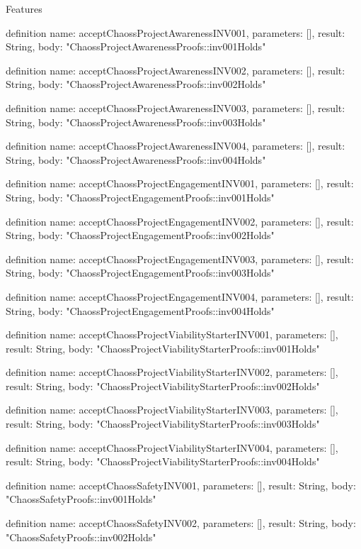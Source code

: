 \begin{lexlean}{Features}
\begin{semanticmodule}
definition{
  name: acceptChaossProjectAwarenessINV001,
  parameters: [],
  result: String,
  body: "ChaossProjectAwarenessProofs::inv001Holds"
}

definition{
  name: acceptChaossProjectAwarenessINV002,
  parameters: [],
  result: String,
  body: "ChaossProjectAwarenessProofs::inv002Holds"
}

definition{
  name: acceptChaossProjectAwarenessINV003,
  parameters: [],
  result: String,
  body: "ChaossProjectAwarenessProofs::inv003Holds"
}

definition{
  name: acceptChaossProjectAwarenessINV004,
  parameters: [],
  result: String,
  body: "ChaossProjectAwarenessProofs::inv004Holds"
}

definition{
  name: acceptChaossProjectEngagementINV001,
  parameters: [],
  result: String,
  body: "ChaossProjectEngagementProofs::inv001Holds"
}

definition{
  name: acceptChaossProjectEngagementINV002,
  parameters: [],
  result: String,
  body: "ChaossProjectEngagementProofs::inv002Holds"
}

definition{
  name: acceptChaossProjectEngagementINV003,
  parameters: [],
  result: String,
  body: "ChaossProjectEngagementProofs::inv003Holds"
}

definition{
  name: acceptChaossProjectEngagementINV004,
  parameters: [],
  result: String,
  body: "ChaossProjectEngagementProofs::inv004Holds"
}

definition{
  name: acceptChaossProjectViabilityStarterINV001,
  parameters: [],
  result: String,
  body: "ChaossProjectViabilityStarterProofs::inv001Holds"
}

definition{
  name: acceptChaossProjectViabilityStarterINV002,
  parameters: [],
  result: String,
  body: "ChaossProjectViabilityStarterProofs::inv002Holds"
}

definition{
  name: acceptChaossProjectViabilityStarterINV003,
  parameters: [],
  result: String,
  body: "ChaossProjectViabilityStarterProofs::inv003Holds"
}

definition{
  name: acceptChaossProjectViabilityStarterINV004,
  parameters: [],
  result: String,
  body: "ChaossProjectViabilityStarterProofs::inv004Holds"
}

definition{
  name: acceptChaossSafetyINV001,
  parameters: [],
  result: String,
  body: "ChaossSafetyProofs::inv001Holds"
}

definition{
  name: acceptChaossSafetyINV002,
  parameters: [],
  result: String,
  body: "ChaossSafetyProofs::inv002Holds"
}


\end{semanticmodule}
\end{lexlean}
